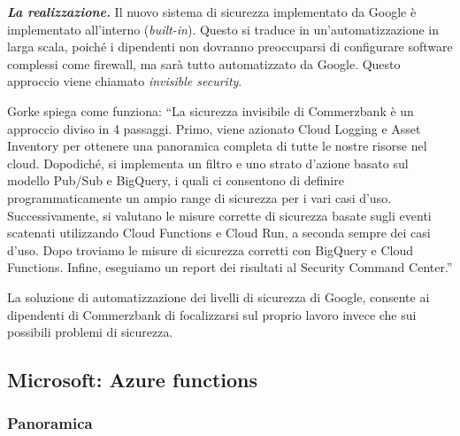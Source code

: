 \documentclass[a4paper]{article}
\newcommand{\dquotes}[1]{``#1''}
\begin{document}
	\noindent
	\textbf{\emph{La realizzazione.}} Il nuovo sistema di sicurezza implementato da Google è implementato all'interno (\emph{built-in}). Questo si traduce in un'automatizzazione in larga scala, poiché i dipendenti non dovranno preoccuparsi di configurare software complessi come firewall, ma sarà tutto automatizzato da Google. Questo approccio viene chiamato \emph{invisible security}.
	
	Gorke spiega come funziona: \dquotes{La sicurezza invisibile di Commerzbank è un approccio diviso in 4 passaggi. Primo, viene azionato Cloud Logging e Asset Inventory per ottenere una panoramica completa di tutte le nostre risorse nel cloud. Dopodiché, si implementa un filtro e uno strato d'azione basato sul modello Pub/Sub e BigQuery, i quali ci consentono di definire programmaticamente un ampio range di sicurezza per i vari casi d'uso. Successivamente, si valutano le misure corrette di sicurezza basate sugli eventi scatenati utilizzando Cloud Functions e Cloud Run, a seconda sempre dei casi d'uso. Dopo troviamo le misure di sicurezza corretti con BigQuery e Cloud Functions. Infine, eseguiamo un report dei risultati al Security Command Center.}
	
	La soluzione di automatizzazione dei livelli di sicurezza di Google, consente ai dipendenti di Commerzbank di focalizzarsi sul proprio lavoro invece che sui possibili problemi di sicurezza.\newpage
	
	\subsection{Microsoft: Azure functions}
	
	\subsubsection{Panoramica}
	
\end{document}

